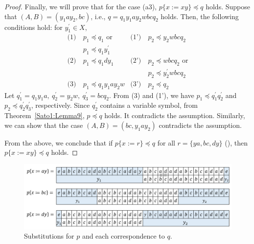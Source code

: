 \begin{proof}
  Finally, we will prove that for the case (a3), $p \{ x := xy \} \preceq q$ holds. Suppose that $(A, B) = (y_{1}ay_{2}, bc)$, i.e., $q = q_{1}y_{1}ay_{2}wbcq_{2} $ holds. Then, the following conditions hold: for $y_{1}^{\prime}\in X$,
  \begin{align*}
    \textrm{(1)}~& p_{1} \preceq q_{1}\mbox{ or} & \textrm{(1')}~& p_{2} \preceq y_{2}wbcq_{2} \\
    & p_{1} \preceq q_{1}y_{1}^{\prime} & & \\
    \textrm{(2)}~& p_{1} \preceq q_{1}dy_{1} & \textrm{(2')}~& p_{2} \preceq wbcq_{2}\mbox{ or}\\    
    & & & p_{2} \preceq y_{2}^{\prime}wbcq_{2} \\
    \textrm{(3)}~& p_{1} \preceq q_{1}y_{1}ay_{2}w & \textrm{(3')}~& p_{2} \preceq q_{2}
  \end{align*}
  Let $q^{\prime}_{1}=q_{1}y_{1}a,~q^{\prime}_{2}=y_{2}w,~q^{\prime}_{3}=bcq_{2}$. From (3) and (1'), we have $p_{1} \preceq q^{\prime}_{1}q^{\prime}_{2}$ and $p_{2} \preceq q^{\prime}_{2}q^{\prime}_{3}$, respectively. Since $q_{2}^{\prime}$ contains a variable symbol,
  from Theorem~\ref{Sato1:Lemma9}, $p \preceq q$ holds. It contradicts the assumption.
  Similarly, we can show that the case $(A, B) = (bc, y_{1}ay_{2})$ contradicts the assumption.
  
  \smallskip
  
  From the above, we conclude that if $p \{ x := r \} \preceq q$ for all $r = \{ ya, bc, dy \}$ (\TheConditionA), then $p \{ x := xy \} \preceq q$ holds.
  \end{proof}

\begin{figure}[t]
  \begin{center}
  \includegraphics[scale=0.45]{figs/Exam_b=a_c=d.png}
  \end{center}
  \caption{Substitutions for $p$ and each correspondence to $q$.}
  \label{b=aとc=dの例}
\end{figure}

